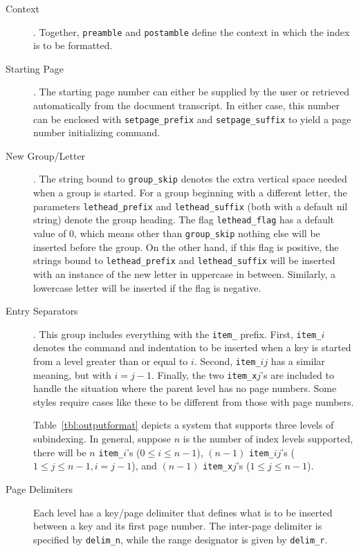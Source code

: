 \begin{description}
\item[Context].  Together, \verb|preamble| and \verb|postamble| 
	define the context in which the index is to be formatted.

\item[Starting Page].  The starting page number can either be supplied
	by the user or retrieved automatically from the document transcript.
	In either case, this number can be enclosed with \verb|setpage_prefix|
	and \verb|setpage_suffix| to yield a page number initializing command.

\item[New Group/Letter].  The string bound to \verb|group_skip|
denotes the extra vertical space needed when a group is started.
For a group beginning with a different letter,
the parameters \verb|lethead_prefix| and \verb|lethead_suffix| (both with
a default nil string) denote the group heading.
The flag \verb|lethead_flag| has a default value of 0, which
means other than \verb|group_skip| nothing else will be inserted before
the group.
On the other hand, if this flag is positive, the strings bound
to \verb|lethead_prefix| and \verb|lethead_suffix| will be inserted with
an instance of the new letter in uppercase in between.  Similarly,
a lowercase letter will be inserted if the flag is negative.

\item[Entry Separators].  This group includes everything with the
\verb|item_| prefix.  First, \verb|item_|$i$
denotes the command and indentation to be inserted when
a key is started from a level greater than or equal to $i$.
Second, \verb|item_|$ij$ has a similar meaning, but with
$i = j-1$.  Finally, the two \verb|item_x|$j$'s
are included to handle the situation where the parent level has no
page numbers.  Some styles require cases like these to be
different from those with page numbers.

Table~\ref{tbl:outputformat} depicts a system that supports three levels of
subindexing.  In general, suppose $n$ is the number of index
levels supported, there will be $n$ \verb|item_|$i$'s 
($0 \leq i \leq n-1$), $(n-1)$ \verb|item_|$ij$'s
($1 \leq j \leq n-1,  i = j-1$), and
$(n-1)$ \verb|item_x|$j$'s ($1 \leq j \leq n-1$).

\item[Page Delimiters]  Each level has a key/page delimiter
that defines what is to be inserted between a key and its first
page number.  The inter-page delimiter is specified by \verb|delim_n|,
while the range designator is given by \verb|delim_r|.


\end{description}
